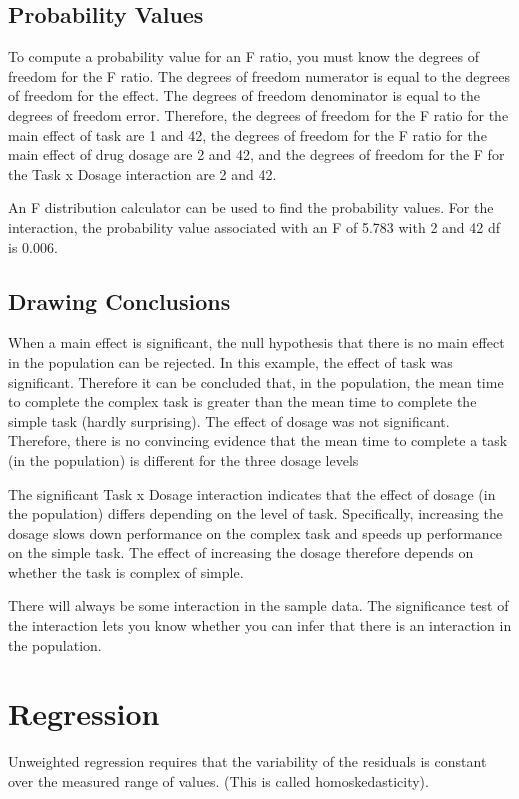 \documentclass[12pt, a4paper]{report}
\theoremstyle{plain}
\theoremstyle{definition}
\theoremstyle{remark}
\begin{document}
\subsection{Probability Values}
To compute a probability value for an F ratio, you must know the degrees of freedom for the F ratio. The degrees of freedom numerator is equal to the degrees of freedom for the effect. The degrees of freedom denominator is equal to the degrees of freedom error. Therefore, the degrees of freedom for the F ratio for the main effect of task are 1 and 42, the degrees of freedom for the F ratio for the main effect of drug dosage are 2 and 42, and the degrees of freedom for the F for the Task x Dosage interaction are 2 and 42.

An F distribution calculator can be used to find the probability values. For the interaction, the probability value associated with an F of 5.783 with 2 and 42 df is 0.006.

\subsection{Drawing Conclusions}

When a main effect is significant, the null hypothesis that there is no main effect in the population can be rejected. In this example, the effect of task was significant. Therefore it can be concluded that, in the population, the mean time to complete the complex task is greater than the mean time to complete the simple task (hardly surprising). The effect of dosage was not significant. Therefore, there is no convincing evidence that the mean time to complete a task (in the population) is different for the three dosage levels

The significant Task x Dosage interaction indicates that the effect of dosage (in the population) differs depending on the level of task. Specifically, increasing the dosage slows down performance on the complex task and speeds up performance on the simple task. The effect of increasing the dosage therefore depends on whether the task is complex of simple.

There will always be some interaction in the sample data. The significance test of the interaction lets you know whether you can infer that there is an interaction in the population.

\section{Regression}
Unweighted regression requires that the variability of the
residuals is constant over the measured range of values.
(This is called homoskedasticity).
\end{document}
